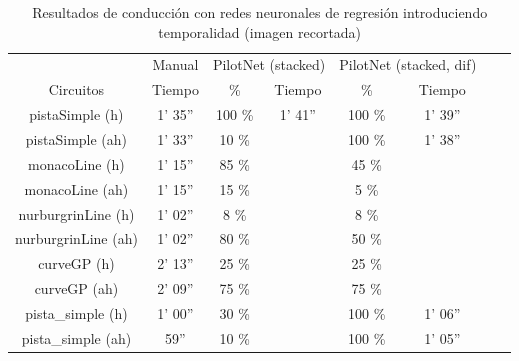 \begin{table}[H]
\centering
\caption{Resultados de conducción con redes neuronales de regresión introduciendo temporalidad (imagen recortada)}
\label{resultados_regresion_temporal_recortada}
\begin{tabular}{c|c|c|c|c|c|c|c|}
\cline{2-6}
                          & \multicolumn{1}{c|}{Manual} & \multicolumn{2}{c|}{PilotNet (stacked)} & \multicolumn{2}{c|}{PilotNet (stacked, dif)} \\ \cline{1-6} 
                        \multicolumn{1}{|c|}{Circuitos}    & Tiempo       & \%       & Tiempo       & \%        & Tiempo      \\ \hline
\multicolumn{1}{|c|}{pistaSimple (h)}    & 1' 35''     & 100 \%   & 1' 41''    & 100 \%   & 1' 39''          \\ \hline
\multicolumn{1}{|c|}{pistaSimple (ah)}     & 1' 33''           & 10 \%        &        & 100 \%     & 1' 38''   \\ \hline
\multicolumn{1}{|c|}{monacoLine (h)}      & 1' 15''           & 85 \%         &        & 45 \%       &            \\ \hline
\multicolumn{1}{|c|}{monacoLine (ah)}       & 1' 15''       & 15 \%       &         & 5 \%           &         \\ \hline
\multicolumn{1}{|c|}{nurburgrinLine (h)}      & 1' 02''       & 8 \%      &       & 8 \%        &        \\ \hline
\multicolumn{1}{|c|}{nurburgrinLine (ah)}       & 1' 02''     & 80 \%     &        & 50 \%     &          \\ \hline
\multicolumn{1}{|c|}{curveGP (h)}     & 2' 13''     & 25 \%       &     & 25 \%     &              \\ \hline
\multicolumn{1}{|c|}{curveGP (ah)}       & 2' 09''            & 75 \%    &     & 75 \%       &       \\ \hline
\multicolumn{1}{|c|}{pista\_simple (h)}       & 1' 00''           & 30 \%       &       & 100 \%      & 1' 06''    \\ \hline
\multicolumn{1}{|c|}{pista\_simple (ah)}     & 59''    & 10 \%    &          & 100 \%      & 1' 05''          \\ \hline
\end{tabular}
\end{table}





